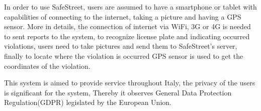 In order to use SafeStreet, users are assumed to have a smartphone or tablet with capabilities of connecting to the internet, taking a picture and having a GPS sensor. More in details, the connection of internet via WiFi, 3G or 4G is needed to sent reports to the system, to recognize license plate and indicating occurred violations, users need to take pictures and send them to SafeStreet's server, finally to locate where the violation is occurred GPS sensor is used to get the coordinates of the violation.

This system is aimed to provide service throughout Italy, the privacy of the users is significant for the system, Thereby it observes General Data Protection Regulation(GDPR) legislated by the European Union.

